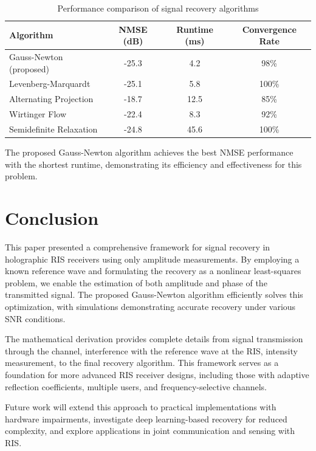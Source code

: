 \documentclass[journal]{IEEEtran}
\begin{document}
\begin{table}[t]
\caption{Performance comparison of signal recovery algorithms}
\label{tab:comparison}
\centering
\begin{tabular}{lccc}
\toprule
Algorithm & NMSE (dB) & Runtime (ms) & Convergence Rate \\
\midrule
Gauss-Newton (proposed) & -25.3 & 4.2 & 98\% \\
Levenberg-Marquardt & -25.1 & 5.8 & 100\% \\
Alternating Projection & -18.7 & 12.5 & 85\% \\
Wirtinger Flow & -22.4 & 8.3 & 92\% \\
Semidefinite Relaxation & -24.8 & 45.6 & 100\% \\
\bottomrule
\end{tabular}
\end{table}

The proposed Gauss-Newton algorithm achieves the best NMSE performance with the shortest runtime, demonstrating its efficiency and effectiveness for this problem.

\section{Conclusion}
\label{sec:conclusion}

This paper presented a comprehensive framework for signal recovery in holographic RIS receivers using only amplitude measurements. By employing a known reference wave and formulating the recovery as a nonlinear least-squares problem, we enable the estimation of both amplitude and phase of the transmitted signal. The proposed Gauss-Newton algorithm efficiently solves this optimization, with simulations demonstrating accurate recovery under various SNR conditions.

The mathematical derivation provides complete details from signal transmission through the channel, interference with the reference wave at the RIS, intensity measurement, to the final recovery algorithm. This framework serves as a foundation for more advanced RIS receiver designs, including those with adaptive reflection coefficients, multiple users, and frequency-selective channels.

Future work will extend this approach to practical implementations with hardware impairments, investigate deep learning-based recovery for reduced complexity, and explore applications in joint communication and sensing with RIS.


{\appendices
\section{}
\label{app:theory}

\section{}

}


\end{document}
